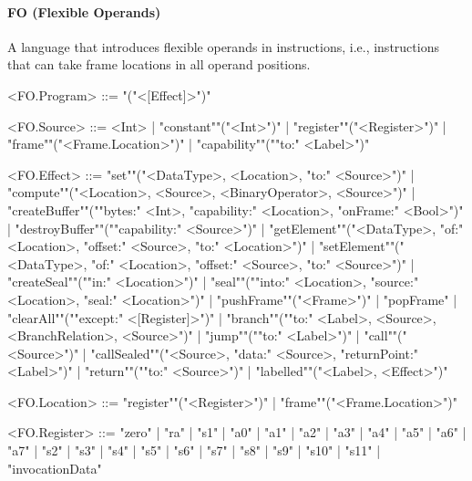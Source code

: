\documentclass[main.tex]{subfiles}
\begin{document}
\paragraph{ FO (Flexible Operands) } A language that introduces flexible operands in instructions, i.e., instructions that can take frame locations in all operand positions.
\begin{grammar}
	\footnotesize
				<FO.Program> ::=
							"("<[Effect]>")"
				\par
				<FO.Source> ::=
						<Int> |
						"constant""("<Int>")"
						| "register""("<Register>")"
						| "frame""("<Frame.Location>")"
						| "capability""(""to:" <Label>")"
				\par
				<FO.Effect> ::=
						"set""("<DataType>, <Location>, "to:" <Source>")"
						| "compute""("<Location>, <Source>, <BinaryOperator>, <Source>")"
						| "createBuffer""(""bytes:" <Int>, "capability:" <Location>, "onFrame:" <Bool>")"
						| "destroyBuffer""(""capability:" <Source>")"
						| "getElement""("<DataType>, "of:" <Location>, "offset:" <Source>, "to:" <Location>")"
						| "setElement""("<DataType>, "of:" <Location>, "offset:" <Source>, "to:" <Source>")"
						| "createSeal""(""in:" <Location>")"
						| "seal""(""into:" <Location>, "source:" <Location>, "seal:" <Location>")"
						| "pushFrame""("<Frame>")"
						| "popFrame"
						| "clearAll""(""except:" <[Register]>")"
						| "branch""(""to:" <Label>, <Source>, <BranchRelation>, <Source>")"
						| "jump""(""to:" <Label>")"
						| "call""("<Source>")"
						| "callSealed""("<Source>, "data:" <Source>, "returnPoint:" <Label>")"
						| "return""(""to:" <Source>")"
						| "labelled""("<Label>, <Effect>")"
				\par
				<FO.Location> ::=
						"register""("<Register>")"
						| "frame""("<Frame.Location>")"
				\par
				<FO.Register> ::=
						"zero"
						| "ra"
						| "s1"
						| "a0"
						| "a1"
						| "a2"
						| "a3"
						| "a4"
						| "a5"
						| "a6"
						| "a7"
						| "s2"
						| "s3"
						| "s4"
						| "s5"
						| "s6"
						| "s7"
						| "s8"
						| "s9"
						| "s10"
						| "s11"
						| "invocationData"
				\par
\end{grammar}
\par
\end{document}
